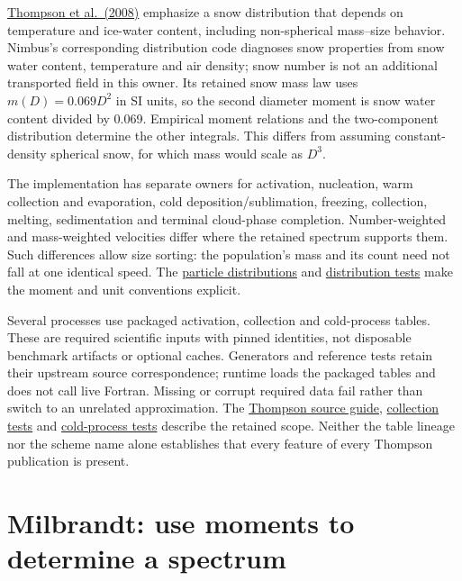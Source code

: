 \documentclass[
  11pt,
]{report}
\begin{document}
\href{https://journals.ametsoc.org/abstract/journals/mwre/136/12/2008mwr2387.1.xml}{Thompson
et al.~(2008)} emphasize a snow distribution that depends on temperature
and ice-water content, including non-spherical mass--size behavior.
Nimbus's corresponding distribution code diagnoses snow properties from
snow water content, temperature and air density; snow number is not an
additional transported field in this owner. Its retained snow mass law
uses \(m(D)=0.069D^2\) in SI units, so the second diameter moment is
snow water content divided by 0.069. Empirical moment relations and the
two-component distribution determine the other integrals. This differs
from assuming constant-density spherical snow, for which mass would
scale as \(D^3\).

The implementation has separate owners for activation, nucleation, warm
collection and evaporation, cold deposition/sublimation, freezing,
collection, melting, sedimentation and terminal cloud-phase completion.
Number-weighted and mass-weighted velocities differ where the retained
spectrum supports them. Such differences allow size sorting: the
population's mass and its count need not fall at one identical speed.
The
\href{../src/microphysics/schemes/thompson/particle_distributions.cpp}{particle
distributions} and
\href{../tests/physics/test_thompson_particle_distributions.cpp}{distribution
tests} make the moment and unit conventions explicit.

Several processes use packaged activation, collection and cold-process
tables. These are required scientific inputs with pinned identities, not
disposable benchmark artifacts or optional caches. Generators and
reference tests retain their upstream source correspondence; runtime
loads the packaged tables and does not call live Fortran. Missing or
corrupt required data fail rather than switch to an unrelated
approximation. The
\href{../src/microphysics/schemes/thompson/README.md}{Thompson source
guide},
\href{../tests/physics/test_thompson_collection_processes.cpp}{collection
tests} and
\href{../tests/physics/test_thompson_cold_processes.cpp}{cold-process
tests} describe the retained scope. Neither the table lineage nor the
scheme name alone establishes that every feature of every Thompson
publication is present.

\section{Milbrandt: use moments to determine a
spectrum}\label{milbrandt-use-moments-to-determine-a-spectrum}
\end{document}
